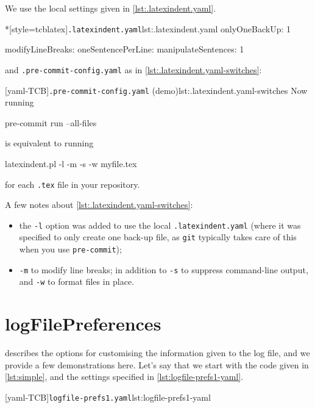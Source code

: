 		\begin{example}
			We use the local settings given in \cref{lst:.latexindent.yaml}.
			\begin{cmhlistings}*[style=tcblatex]{\texttt{.latexindent.yaml}}{lst:.latexindent.yaml}
onlyOneBackUp: 1

modifyLineBreaks:
 oneSentencePerLine:
   manipulateSentences: 1
\end{cmhlistings}

			and \texttt{.pre-commit-config.yaml} as in \cref{lst:.latexindent.yaml-switches}:

			[yaml-TCB]{\texttt{.pre-commit-config.yaml} (demo)}{lst:.latexindent.yaml-switches}
			Now running
			\begin{commandshell}
pre-commit run --all-files  
\end{commandshell}
			is equivalent to running
			\begin{commandshell}
latexindent.pl -l -m -s -w myfile.tex
\end{commandshell}
			for each \texttt{.tex} file in your repository.

			A few notes about \cref{lst:.latexindent.yaml-switches}:
			\begin{itemize}
				\item the \texttt{-l} option was added to use the local \texttt{.latexindent.yaml} (where it
				      was specified to only create one back-up file, as \texttt{git} typically takes care of
				      this when you use \texttt{pre-commit});
				\item \texttt{-m} to modify line breaks; in addition to \texttt{-s} to suppress command-line
				      output, and \texttt{-w} to format files in place.
			\end{itemize}
		\end{example}

	\section{logFilePreferences}\label{app:logfile-demo}
	  describes the options for customising the information given
	 to the log file, and we provide a few demonstrations here. Let's say that we start with
	 the code given in \cref{lst:simple}, and the settings specified in
	 \cref{lst:logfile-prefs1-yaml}.

	 \begin{minipage}{.35\linewidth}
	 \end{minipage}
	 \hfill
	 \begin{minipage}{.6\linewidth}
		 [yaml-TCB]{\texttt{logfile-prefs1.yaml}}{lst:logfile-prefs1-yaml}
	 \end{minipage}

